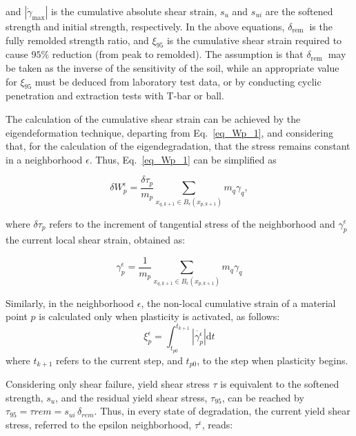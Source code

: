 \documentclass[applsci,journal,article,submit,moreauthors,pdftex]{Definitions/mdpi}
\begin{document}
and $\left|\dot{\gamma}_{\max }\right|$ is the cumulative absolute shear strain, $s_{u}$ and $s_{u i}$ are the softened strength and initial strength, respectively. In the above equations, $\delta_{\text {rem }}$ is the fully remolded strength ratio, and $\xi_{95}$ is the cumulative shear strain required to cause $95 \%$ reduction (from peak to remolded). The assumption is that $\delta_{\text {rem }}$ may be taken as the inverse of the sensitivity of the soil, while an appropriate value for $\xi_{95}$ must be deduced from laboratory test data, or by conducting cyclic penetration and extraction tests with T-bar or ball.

The calculation of the cumulative shear strain can be achieved by the eigendeformation technique, departing from Eq.~\eqref{eq_Wp_1}, and considering that, for the calculation of the eigendegradation, that the stress remains constant in a neighborhood $\epsilon$. Thus, Eq.~\eqref{eq_Wp_1} can be simplified as

\begin{equation}\label{eq_Wp_4}
\delta W^\epsilon_{p}=\frac{\delta \tau_p} {m_{p}} \sum_{x_{q,k+1}\in B_\epsilon (x_{p,k+1})} m_q \gamma_{q},
\end{equation}

where $\delta \tau_p$ refers to the increment of tangential stress of the neighborhood and $\gamma^{\epsilon}_{p}$ the current local shear strain, obtained as:

\begin{equation}\label{eq_Wp_5}
\gamma^{\epsilon}_{p}=\frac{1}{m_{p}}\sum_{x_{q,k+1}\in B_\epsilon (x_{p,k+1})}m_q \gamma_{q}
\end{equation}

Similarly, in the neighborhood $\epsilon$, the non-local cumulative strain of a material point $p$ is calculated only when plasticity is activated, as follows:
\begin{equation}\label{eq18}
\xi^{\epsilon}_{p}=\int^{t_{k+1}}_{t_{p0}}\left|\dot{\gamma^{\epsilon}_{p}}\right| \mathrm{d} t
\end{equation}
where $t_{k+1}$ refers to the current step, and $t_{p0}$, to the step when plasticity begins. 

Considering only shear failure, yield shear stress $\tau$ is equivalent to the softened strength, $s_u$, and the residual yield shear stress, $\tau_{95}$, can be reached by $\tau_{95}=\tau{rem}=s_{ui} \, \delta_{rem}$. Thus, in every state of degradation, the current yield shear stress, referred to the epsilon neighborhood, $\tau^{\epsilon}$, reads:
\end{document}
